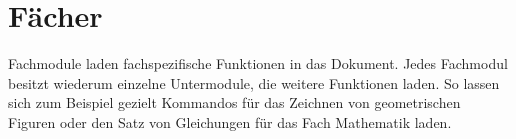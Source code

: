 

\part{Fächer}

Fachmodule laden fachspezifische Funktionen in das Dokument. Jedes Fachmodul
besitzt wiederum einzelne Untermodule, die weitere Funktionen laden. So lassen sich
zum Beispiel gezielt Kommandos für das Zeichnen von geometrischen Figuren oder
den Satz von Gleichungen für das Fach Mathematik laden.
